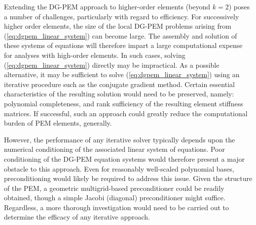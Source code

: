 Extending the DG-PEM approach to higher-order elements (beyond $k=2$) poses a number of challenges, particularly with regard to efficiency. For successively higher order elements, the size of the local DG-PEM problems arising from (\ref{eq:dgpem_linear_system}) can become large. The assembly and solution of these systems of equations will therefore impart a large computational expense for analyses with high-order elements. In such cases, solving (\ref{eq:dgpem_linear_system}) directly may be impractical. As a possible alternative, it may be sufficient to solve (\ref{eq:dgpem_linear_system}) using an iterative procedure such as the conjugate gradient method. Certain essential characteristics of the resulting solution would need to be preserved, namely: polynomial completeness, and rank sufficiency of the resulting element stiffness matrices. If successful, such an approach could greatly reduce the computational burden of PEM elements, generally.

However, the performance of any iterative solver typically depends upon the numerical conditioning of the associated linear system of equations. Poor conditioning of the DG-PEM equation systems would therefore present a major obstacle to this approach. Even for reasonably well-scaled polynomial bases, preconditioning would likely be required to address this issue. Given the structure of the PEM, a geometric multigrid-based preconditioner could be readily obtained, though a simple Jacobi (diagonal) preconditioner might suffice. Regardless, a more thorough investigation would need to be carried out to determine the efficacy of any iterative approach.